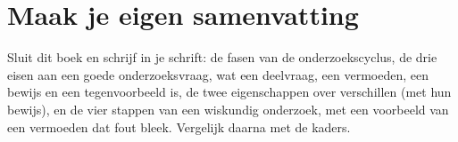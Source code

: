 

\begin{oefeningen}


\end{oefeningen}


\begin{oefeningen}




\end{oefeningen}


\ifzelfstudie
\section*{Maak je eigen samenvatting}
Sluit dit boek en schrijf in je schrift: de fasen van de onderzoekscyclus, de drie eisen aan een goede onderzoeksvraag, wat een deelvraag, een vermoeden, een bewijs en een tegenvoorbeeld is, de twee eigenschappen over verschillen (met hun bewijs), en de vier stappen van een wiskundig onderzoek, met een voorbeeld van een vermoeden dat fout bleek. Vergelijk daarna met de kaders.
\fi
